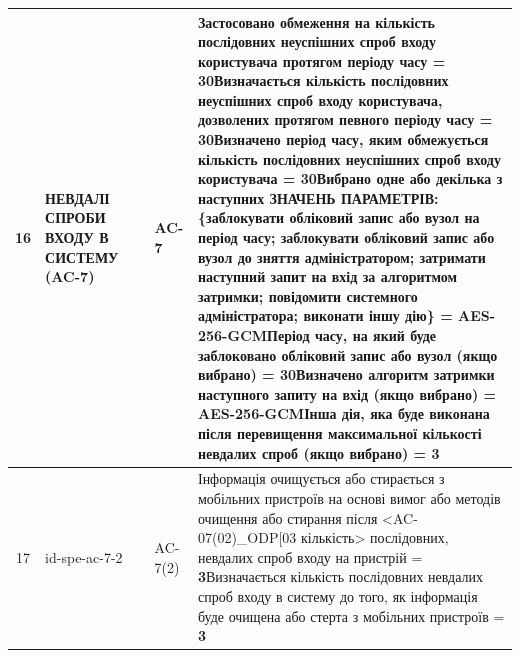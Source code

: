 \documentclass[10pt]{article}
\begin{document}
\begin{longtable}{|c|>{\raggedright\arraybackslash}p{4cm}|>{\raggedright\arraybackslash}p{2.5cm}|>{\raggedright\arraybackslash}p{3.5cm}|>{\raggedright\arraybackslash}p{5.5cm}|}
16 & НЕВДАЛІ СПРОБИ ВХОДУ В СИСТЕМУ (AC-7) &  & AC-7 & Застосовано обмеження на кількість послідовних неуспішних спроб входу користувача протягом періоду часу = \textbf{30}\newline Визначається кількість послідовних неуспішних спроб входу користувача, дозволених протягом певного періоду часу = \textbf{30}\newline Визначено період часу, яким обмежується кількість послідовних неуспішних спроб входу користувача = \textbf{30}\newline Вибрано одне або декілька з наступних ЗНАЧЕНЬ ПАРАМЕТРІВ: \{заблокувати обліковий запис або вузол на період часу; заблокувати обліковий запис або вузол до зняття адміністратором; затримати наступний запит на вхід за алгоритмом затримки; повідомити системного адміністратора; виконати іншу дію\} = \textbf{AES-256-GCM}\newline Період часу, на який буде заблоковано обліковий запис або вузол (якщо вибрано) = \textbf{30}\newline Визначено алгоритм затримки наступного запиту на вхід (якщо вибрано) = \textbf{AES-256-GCM}\newline Інша дія, яка буде виконана після перевищення максимальної кількості невдалих спроб (якщо вибрано) = \textbf{3} \\ \hline
17 & id-spe-ac-7-2 &  & AC-7(2) & Інформація очищується або стирається з мобільних пристроїв на основі вимог або методів очищення або стирання після <AC-07(02)\_\allowbreak{}ODP[03 кількість> послідовних, невдалих спроб входу на пристрій = \textbf{3}\newline Визначається кількість послідовних невдалих спроб входу в систему до того, як інформація буде очищена або стерта з мобільних пристроїв = \textbf{3} \\ \hline

\end{longtable}
\end{document}
